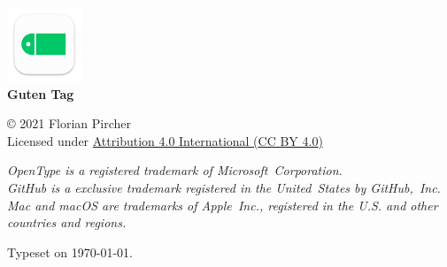 \begin{center}
  \vfill
  
  \includegraphics[width=6em]{Images/Icon.pdf} \\
  \textbf{Guten Tag} \\
  
  \vfill
  
  © 2021 Florian Pircher \\
  {Licensed under \href{https://creativecommons.org/licenses/by/4.0/}{Attribution 4.0 International ({\lsstyle{}CC BY 4.0})}}
  
  \bigskip
  
  \bgroup
  \fontsize{8.5pt}{12pt}\selectfont
  
  \emph{\emph{OpenType} is a registered trademark of Microsoft~Corporation.} \\
  \emph{\emph{GitHub} is a exclusive trademark registered in the United~States by GitHub,~Inc.} \\
  \emph{\emph{Mac} and \emph{macOS} are trademarks of Apple~Inc., registered in the U.S. and other countries and regions.} \\
  \egroup
  
  \bigskip
  
  Typeset on \today.
\end{center}
